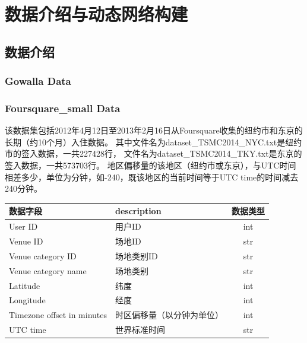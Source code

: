 
\part{数据介绍与动态网络构建}
    \chapter{数据介绍}
        \section{Gowalla Data}
        \section{Foursquare\_small Data}
        该数据集包括2012年4月12日至2013年2月16日从Foursquare收集的纽约市和东京的长期（约10个月）入住数据。
            其中文件名为dataset\_TSMC2014\_NYC.txt是纽约市的签入数据，一共227428行，
            文件名为dataset\_TSMC2014\_TKY.txt是东京的签入数据，一共573703行。
            地区偏移量的该地区（纽约市或东京），与UTC时间相差多少，单位为分钟，如-240，既该地区的当前时间等于UTC time的时间减去240分钟。

            \begin{table}[H]
            \begin{tabular}{llc}
            \hline
            数据字段                       & description   & 数据类型 \\ \hline
            User ID                    & 用户ID          & int  \\
            Venue ID                   & 场地ID          & str  \\
            Venue category ID          & 场地类别ID        & str  \\
            Venue category name        & 场地类别          & str  \\
            Latitude                   & 纬度            & int  \\
            Longitude                  & 经度            & int  \\
            Timezone offset in minutes & 时区偏移量（以分钟为单位） & int  \\
            UTC time                   & 世界标准时间        & str  \\ \hline
            \end{tabular}
            \end{table}

